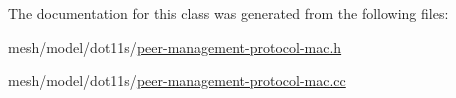 The documentation for this class was generated from the following files\+:\begin{DoxyCompactItemize}
\item 
mesh/model/dot11s/\hyperlink{peer-management-protocol-mac_8h}{peer-\/management-\/protocol-\/mac.\+h}\item 
mesh/model/dot11s/\hyperlink{peer-management-protocol-mac_8cc}{peer-\/management-\/protocol-\/mac.\+cc}\end{DoxyCompactItemize}
